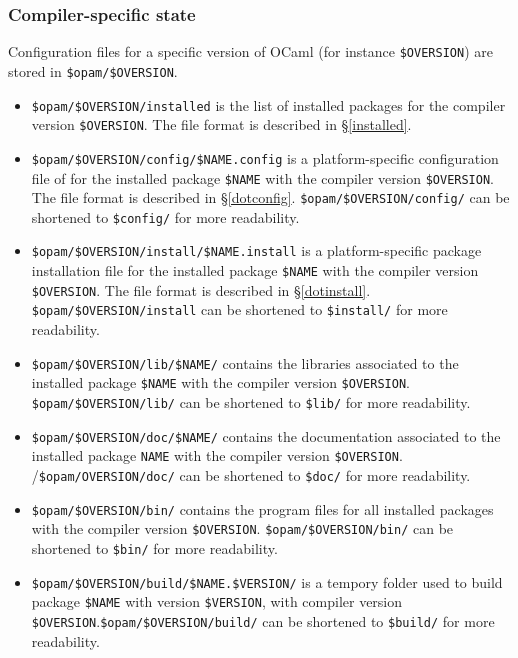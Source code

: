 \documentclass[a4paper,11pt]{article}
\begin{document}
\subsubsection{Compiler-specific state}

Configuration files for a specific version of OCaml (for instance
\verb+$OVERSION+) are stored in \verb+$opam/$OVERSION+.

\begin{itemize}

\item \verb+$opam/$OVERSION/installed+ is the list of installed
  packages for the compiler version \verb+$OVERSION+. The file format
  is described in \S\ref{installed}.

\item \verb+$opam/$OVERSION/config/$NAME.config+ is a
  platform-specific configuration file of for the installed package
  \verb+$NAME+ with the compiler version \verb+$OVERSION+. The file
  format is described in \S\ref{dotconfig}.
  \verb+$opam/$OVERSION/config/+ can be shortened to \verb+$config/+
  for more readability.

\item \verb+$opam/$OVERSION/install/$NAME.install+ is a
  platform-specific package installation file for the installed
  package \verb+$NAME+ with the compiler version \verb+$OVERSION+. The
  file format is described in \S\ref{dotinstall}.
  \verb+$opam/$OVERSION/install+ can be shortened to \verb+$install/+
  for more readability.

\item \verb+$opam/$OVERSION/lib/$NAME/+ contains the libraries
  associated to the installed package \verb+$NAME+ with the compiler
  version \verb+$OVERSION+. \verb+$opam/$OVERSION/lib/+ can be
  shortened to \verb+$lib/+ for more readability.

\item \verb+$opam/$OVERSION/doc/$NAME/+ contains the documentation
  associated to the installed package {\tt NAME} with the compiler
  version \verb+$OVERSION+. /\verb+$opam/OVERSION/doc/+ can be
  shortened to \verb+$doc/+ for more readability.

\item \verb+$opam/$OVERSION/bin/+ contains the program files for all
  installed packages with the compiler version
  \verb+$OVERSION+. \verb+$opam/$OVERSION/bin/+ can be shortened to
  \verb+$bin/+ for more readability.

\item \verb+$opam/$OVERSION/build/$NAME.$VERSION/+ is a tempory folder
  used to build package \verb+$NAME+ with version \verb+$VERSION+,
  with compiler version \verb+$OVERSION+.\verb+$opam/$OVERSION/build/+
  can be shortened to \verb+$build/+ for more readability.

\end{itemize}
\end{document}

